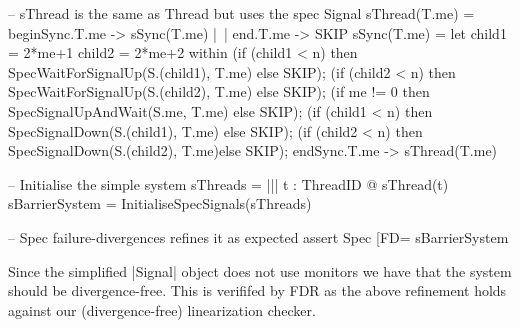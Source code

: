 \begin{cspm}
  -- sThread is the same as Thread but uses the spec Signal
  sThread(T.me) = beginSync.T.me -> sSync(T.me) |~| end.T.me -> SKIP
  sSync(T.me) = 
    let child1 = 2*me+1 
        child2 = 2*me+2
    within (if (child1 < n) then SpecWaitForSignalUp(S.(child1), T.me) else SKIP);
          (if (child2 < n) then SpecWaitForSignalUp(S.(child2), T.me) else SKIP);
          (if me != 0 then SpecSignalUpAndWait(S.me, T.me) else SKIP);
          (if (child1 < n) then SpecSignalDown(S.(child1), T.me) else SKIP);
          (if (child2 < n) then SpecSignalDown(S.(child2), T.me)else SKIP);
          endSync.T.me -> sThread(T.me)

  -- Initialise the simple system
  sThreads = ||| t : ThreadID @ sThread(t)     
  sBarrierSystem = InitialiseSpecSignals(sThreads)

  -- Spec failure-divergences refines it as expected
  assert Spec [FD= sBarrierSystem
\end{cspm}

Since the simplified |Signal| object does not use monitors we have that the system should be divergence-free. This is verififed by FDR as the above refinement holds against our (divergence-free) linearization checker.









